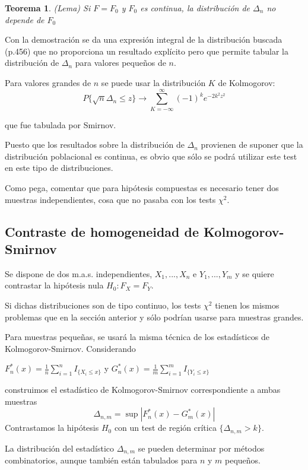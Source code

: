 \documentclass[a4paper,12pt]{article}
\newtheorem{theorem}{Teorema}
\begin{document}
\begin{theorem}
(Lema) Si $F = F_0$ y $F_0$ es continua, la distribución de $\Delta_n$ no depende de $F_0$
\end{theorem}
Con la demostración se da una expresión integral de la distribución buscada (p.456) que no proporciona un resultado explícito pero que permite tabular la distribución de $\Delta_n$ para valores pequeños de $n$.

Para valores grandes de $n$ se puede usar la distribución $K$ de Kolmogorov:
$$P\{\sqrt{n}\Delta_n \leq z \} \longrightarrow \sum^{\infty}_{K=-\infty} (-1)^{k} e^{-2k^2 z^2}  $$

que fue tabulada por Smirnov.

Puesto que los resultados sobre la distribución de $\Delta_n$ provienen de suponer que la distribución poblacional es continua, es obvio que sólo se podrá utilizar este test en este tipo de distribuciones.

Como pega, comentar que para hipótesis compuestas es necesario tener dos muestras independientes, cosa que no pasaba con los tests $\chi^2$.



\subsection{Contraste de homogeneidad de Kolmogorov-Smirnov}

Se dispone de dos m.a.s. independientes, $X_1,...,X_n $ e $Y_1,...,Y_m$ y se quiere contrastar la hipótesis nula $H_0:F_X = F_Y$.

Si dichas distribuciones son de tipo continuo, los tests $\chi^2$ tienen los mismos problemas que en la sección anterior y sólo podrían usarse para muestras grandes.

Para muestras pequeñas, se usará la misma técnica de los estadísticos de Kolmogorov-Smirnov. Considerando
\begin{center}
$F^*_n (x)=\frac{1}{n}\sum_{i=1}^n I_{\{X_i \leq x\}}$ y $G^*_n (x)=\frac{1}{m}\sum_{i=1}^m I_{\{Y_i \leq x\}}$
\end{center}
construimos el estadístico de Kolmogorov-Smirnov correspondiente a ambas muestras $$\Delta_{n,m}=\sup|F^*_n(x)-G^*_m (x)|$$
Contrastamos la hipótesis $H_0$ con un test de región crítica $\{ \Delta_{n,m} > k\}$.

La distribución del estadístico $\Delta_{n,m}$ se pueden determinar por métodos combinatorios, aunque también están tabulados para $n$ y $m$ pequeños.
\end{document}
